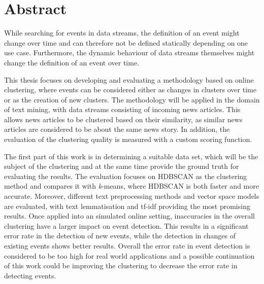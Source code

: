 
\section*{Abstract}


While searching for events in data streams, the definition of an event might change over time and can therefore not be defined statically depending on one use case. Furthermore, the dynamic behaviour of data streams themselves might change the definition of an event over time.

This thesis focuses on developing and evaluating a methodology based on online clustering, where events can be considered either as changes in clusters over time or as the creation of new clusters. The methodology will be applied in the domain of text mining, with data streams consisting of incoming news articles. This allows news articles to be clustered based on their similarity, as similar news articles are considered to be about the same news story. In addition, the evaluation of the clustering quality is measured with a custom scoring function.

The first part of this work is in determining a suitable data set, which will be the subject of the clustering and at the same time provide the ground truth for evaluating the results. The evaluation focuses on HDBSCAN as the clustering method and compares it with \textit{k}-means, where HDBSCAN is both faster and more accurate. Moreover, different text preprocessing methods and vector space models are evaluated, with text lemmatisation and tf-idf providing the most promising results. Once applied into an simulated online setting, inaccuracies in the overall clustering have a larger impact on event detection. This results in a significant error rate in the detection of new events, while the detection in changes of existing events shows better results. Overall the error rate in event detection is considered to be too high for real world applications and a possible continuation of this work could be improving the clustering to decrease the error rate in detecting events.


